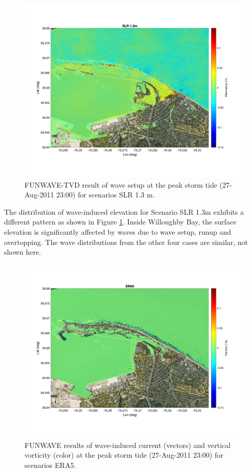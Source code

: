 \documentclass[11pt]{article}
\begin{document}
\begin{figure}[h!]
\centering
\includegraphics[width=\textwidth]{./figures/funwave_SLR_setup.jpg}
\caption{FUNWAVE-TVD result of wave setup at the peak storm tide (27-Aug-2011 23:00) for scenarios SLR 1.3 m. }
\label{funwave_SLR_setup}
\centering
\end{figure}

The distribution of wave-induced elevation for Scenario SLR 1.3m exhibits a different pattern as shown in Figure \ref{funwave_SLR_setup}. Inside Willoughby Bay, the surface elevation is significantly affected by waves due to wave setup, runup and overtopping. The wave distributions from the other four cases are similar, not shown here.  

\begin{figure}[h!]
\centering
\includegraphics[width=\textwidth]{./figures/funwave_ERA5_vort.jpg}
\caption{FUNWAVE results of wave-induced current (vectors) and vertical vorticity (color) at the peak storm tide (27-Aug-2011 23:00) for scenarios ERA5. }
\label{funwave_ERA5_vort}
\centering
\end{figure}
\end{document}
